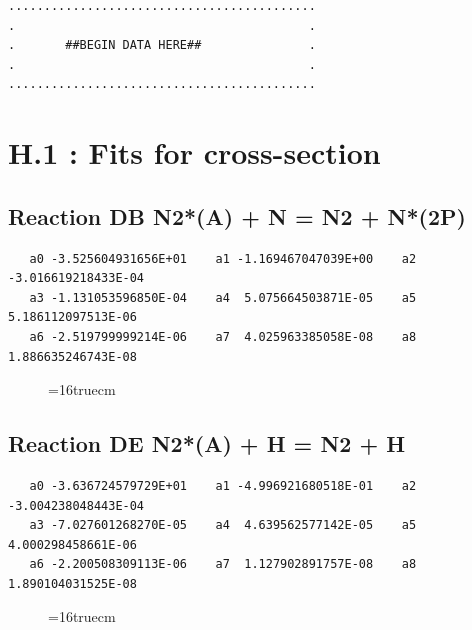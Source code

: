 \documentclass[12pt]{article}
\begin{document}
\bigskip
\begin{small}\begin{verbatim}
...........................................
.                                         .
.       ##BEGIN DATA HERE##               .
.                                         .
...........................................
\end{verbatim}\end{small}
\newpage

\setcounter{section}{0}

\section{H.1 : Fits for cross-section }

\subsection{
Reaction DB N2*(A) + N  = N2 + N*(2P)}
\begin{small}\begin{verbatim}
   a0 -3.525604931656E+01    a1 -1.169467047039E+00    a2 -3.016619218433E-04
   a3 -1.131053596850E-04    a4  5.075664503871E-05    a5  5.186112097513E-06
   a6 -2.519799999214E-06    a7  4.025963385058E-08    a8  1.886635246743E-08
   \end{verbatim}\end{small}
\begin{figure}[h!] \label{n2rates}
\epsfxsize=16truecm
\end{figure}
\newpage

\subsection{
Reaction DE N2*(A) + H = N2 + H}
\begin{small}\begin{verbatim}
   a0 -3.636724579729E+01    a1 -4.996921680518E-01    a2 -3.004238048443E-04
   a3 -7.027601268270E-05    a4  4.639562577142E-05    a5  4.000298458661E-06
   a6 -2.200508309113E-06    a7  1.127902891757E-08    a8  1.890104031525E-08
   \end{verbatim}\end{small}
\begin{figure}[h!] \label{n2rates}
\epsfxsize=16truecm
\end{figure}
\newpage
\end{document}
